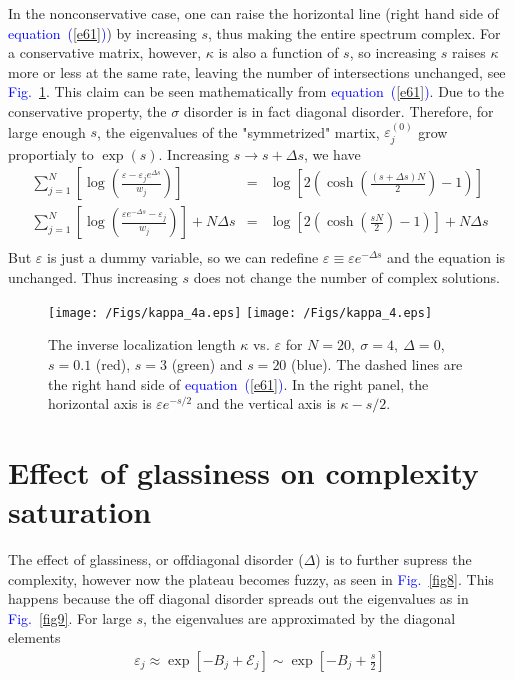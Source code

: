 \documentclass[aps,pre,floats,floatfix,fleqn,notitlepage]{revtex4-1}
\newcommand{\beq}{\begin{eqnarray}}
\newcommand{\eeq}{\end{eqnarray}}
\newcommand{\Eq}[1]{\textcolor{blue}{equation~(\ref{#1})}} %
\newcommand{\Fig}[1] {\textcolor{blue}{Fig.~\ref{#1}}} %
\begin{document}
%
In the nonconservative case, one can raise the horizontal line (right hand side of \Eq{e61}) by increasing $s$,
thus making the entire spectrum complex. 
For a conservative matrix, however, $\kappa$ is also a function of $s$, so increasing $s$ raises $\kappa$ 
more or less at the same rate, leaving the number of intersections unchanged, see \Fig{fig7}.
%
This claim can be seen mathematically from \Eq{e61}.
Due to the conservative property, the $\sigma$ disorder is in fact diagonal disorder. Therefore, for large enough $s$, the eigenvalues of the "symmetrized" martix, $\varepsilon_j^{(0)}$ grow proportialy to $\exp (s)$. 
Increasing $s \to s+\Delta s$, we have
%
\beq
\sum_{j=1}^N \left[ \log \left(\frac{\varepsilon - \varepsilon_j e^{\Delta s}}{w_j}\right)\right] &=&
 \log \left[2\left(\cosh\left(\frac{(s+\Delta s)N}{2}\right) -1\right)\right] \\
\sum_{j=1}^N \left[ \log \left(\frac{\varepsilon e^{-\Delta s} - \varepsilon_j }{w_j}\right)\right]  + N\Delta s&=&
 \log \left[2\left(\cosh\left(\frac{sN}{2}\right) -1\right)\right] +N\Delta s\\ 
\eeq
%
But $\varepsilon$ is just a dummy variable, so we can redefine $\varepsilon \equiv \varepsilon e^{-\Delta s}$ and the equation is unchanged. Thus increasing $s$ does not change the number of complex solutions.


\begin{figure}[h]
\texttt{[image: /Figs/kappa\_4a.eps]}
\texttt{[image: /Figs/kappa\_4.eps]}
\caption{
The inverse localization length $\kappa$ vs. $\varepsilon$ for ${N=20, \ \sigma=4, \ \Delta=0}$, $s=0.1$ (red), $s=3$ (green) and $s=20$ (blue). The dashed lines are the right hand side of \Eq{e61}.
In the right panel, the horizontal axis is $\varepsilon e^{-s/2}$ and the vertical axis is $ \kappa-s/2$.
}
\label{fig7}
\end{figure}
%


\section{Effect of glassiness on complexity saturation}
The effect of glassiness, or offdiagonal disorder ($\Delta$) is to further supress the complexity, however now the plateau becomes fuzzy, as seen in \Fig{fig8}. This happens because the off diagonal disorder spreads out the eigenvalues as in \Fig{fig9}.
For large $s$, the eigenvalues are approximated by the diagonal elements
%
\beq
\varepsilon_j \approx \exp \left[-B_j + \mathcal{E}_j \right] \sim \exp\left[-B_j +\frac{s}{2}\right]
\eeq
\end{document}
